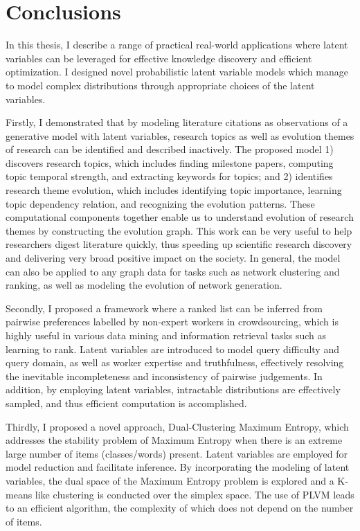 \chapter{Conclusions}

In this thesis, I describe a range of practical real-world applications where
latent variables can be leveraged for effective knowledge discovery and
efficient optimization. I designed novel probabilistic latent variable models
which manage to model complex distributions through appropriate choices of the
latent variables.

Firstly, I demonstrated that by modeling literature citations as observations of
a generative model with latent variables, research topics as well as evolution
themes of research can be identified and described inactively. The proposed
model 1) discovers research topics, which includes finding milestone papers,
computing topic temporal strength, and extracting keywords for topics; and 2)
identifies research theme evolution, which includes identifying topic
importance, learning topic dependency relation, and recognizing the evolution
patterns. These computational components together enable us to understand
evolution of research themes by constructing the evolution graph.  This work can
be very useful to help researchers digest literature quickly, thus speeding up
scientific research discovery and delivering very broad positive impact on the
society. In general, the model can also be applied to any graph data for tasks
such as network clustering and ranking, as well as modeling the evolution of
network generation.


Secondly, I proposed a framework where a ranked list can be inferred from
pairwise preferences labelled by non-expert workers in crowdsourcing, which is
highly useful in various data mining and information retrieval tasks such as
learning to rank. Latent variables are introduced to model query difficulty and
query domain, as well as worker expertise and truthfulness, effectively
resolving the inevitable incompleteness and inconsistency of pairwise
judgements. In addition, by employing latent variables, intractable
distributions are effectively sampled, and thus efficient computation is
accomplished.

Thirdly, I proposed a novel approach, Dual-Clustering Maximum Entropy, which
addresses the stability problem of Maximum Entropy when there is an extreme
large number of items (classes/words) present. Latent variables are employed for
model reduction and facilitate inference. By incorporating the modeling of
latent variables, the dual space of the Maximum Entropy problem is explored and
a K-means like clustering is conducted over the simplex space. The use of PLVM
leads to an efficient algorithm, the complexity of which does not depend on the
number of items.

